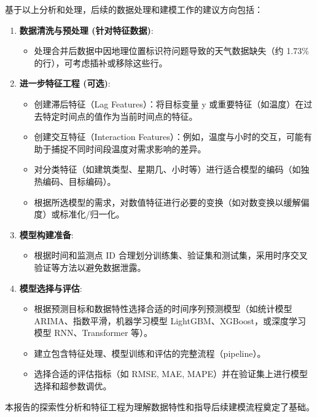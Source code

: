 \documentclass{article} %
\begin{document}
基于以上分析和处理，后续的数据处理和建模工作的建议方向包括：
\begin{enumerate}
    \item \textbf{数据清洗与预处理 (针对特征数据)}:
        \begin{itemize}
            \item 处理合并后数据中因地理位置标识符问题导致的天气数据缺失（约 1.73\% 的行），可考虑插补或移除这些行。
        \end{itemize}
    \item \textbf{进一步特征工程 (可选)}:
        \begin{itemize}
            \item 创建滞后特征（Lag Features）：将目标变量 y 或重要特征（如温度）在过去特定时间点的值作为当前时间点的特征。
            \item 创建交互特征（Interaction Features）：例如，温度与小时的交互，可能有助于捕捉不同时间段温度对需求影响的差异。
            \item 对分类特征（如建筑类型、星期几、小时等）进行适合模型的编码（如独热编码、目标编码）。
            \item 根据所选模型的需求，对数值特征进行必要的变换（如对数变换以缓解偏度）或标准化/归一化。
        \end{itemize}
    \item \textbf{模型构建准备}:
        \begin{itemize}
            \item 根据时间和监测点 ID 合理划分训练集、验证集和测试集，采用时序交叉验证等方法以避免数据泄露。
        \end{itemize}
    \item \textbf{模型选择与评估}:
        \begin{itemize}
            \item 根据预测目标和数据特性选择合适的时间序列预测模型（如统计模型 ARIMA、指数平滑，机器学习模型 LightGBM、XGBoost，或深度学习模型 RNN、Transformer 等）。
            \item 建立包含特征处理、模型训练和评估的完整流程（pipeline）。
            \item 选择合适的评估指标（如 RMSE, MAE, MAPE）并在验证集上进行模型选择和超参数调优。
        \end{itemize}
\end{enumerate}

本报告的探索性分析和特征工程为理解数据特性和指导后续建模流程奠定了基础。
\end{document}
